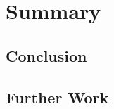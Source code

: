 

\chapter{Summary} %
\label{chap:Summary}

\section{Conclusion} %
\label{sec:Conclusion}



\section{Further Work} %
\label{sec:Further Work}



